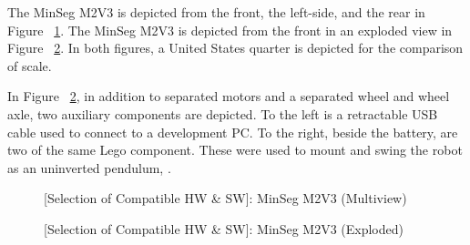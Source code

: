 \documentclass[crop=false,float=true,class=scrreprt]{standalone}
\begin{document}
\vspace*{+2em}


The MinSeg M2V3 is depicted from the front, the left-side, and the rear in Figure~%
\ref{FIG:preliminaryDecisions:selectionHardwareSoftware:hardware:multiview}.
The MinSeg M2V3 is depicted from the front in an exploded view in Figure~%
\ref{FIG:preliminaryDecisions:selectionHardwareSoftware:hardware:exploded}.
In both figures, a United States quarter is depicted for the comparison of scale.

In Figure~%
\ref{FIG:preliminaryDecisions:selectionHardwareSoftware:hardware:exploded},
in addition to separated motors and a separated wheel and wheel axle,
two auxiliary components are depicted.
To the left is a retractable USB cable used to connect to a development PC. 
To the right, beside the battery, are two of the same Lego component.
These were used to mount and swing the robot as an uninverted pendulum, 
{}.




\clearpage




\begin{landscape}
\begin{figure}[H]%
\centering%
\small%
\begin{minipage}[c][0.995\textheight][c]{0.995\linewidth}%
\centering%
\caption[{[Selection of Compatible HW \& SW]: MinSeg M2V3 (Multiview)}]%
        {{[Selection of Compatible HW \& SW]: MinSeg M2V3 (Multiview)%
          \label{FIG:preliminaryDecisions:selectionHardwareSoftware:hardware:multiview}%
        }}%
\end{minipage}%
\end{figure}
\end{landscape}




\clearpage




\vspace*{\fill}
\begin{figure}[H]%
\centering%
\small%
\centering%
\caption[{[Selection of Compatible HW \& SW]: MinSeg M2V3 (Exploded)}]%
        {{[Selection of Compatible HW \& SW]: MinSeg M2V3 (Exploded)%
          \label{FIG:preliminaryDecisions:selectionHardwareSoftware:hardware:exploded}%
        }}%
\end{figure}
\vspace*{\fill}




\clearpage
\end{document}
